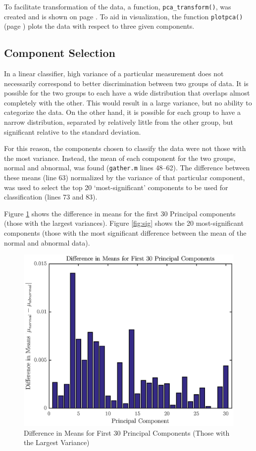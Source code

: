\documentclass[titlepage,12pt,letter]{article}
\begin{document}
To facilitate transformation of the data, a function, \verb`pca_transform()`,
was created and is shown on page \pageref{fun:pca}.  To aid in visualization,
the function \verb`plotpca()` (page \pageref{fun:plotpca}) plots the data with
respect to three given components.  

\newpage
\subsection{Component Selection}
In a linear classifier, high variance of a particular measurement does not
necessarily correspond to better discrimination between two groups of data.  It
is possible for the two groups to each have a wide distribution that overlaps
almost completely with the other.  This would result in a large variance, but no
ability to categorize the data.  On the other hand, it is possible for each
group to have a narrow distribution, separated by relatively little from the 
other group, but significant relative to the standard deviation.  

For this reason, the components chosen to classify the data were not those with
the most variance.  Instead, the mean of each component for the two groups,
normal and abnormal, was found (\verb`gather.m` lines 48--62).  The difference
between these means (line 63) normalized by the variance of that particular
component, was used to select the top 20 `most-significant' components to be
used for classification (lines 73 and 83).  

Figure \ref{fig:diff} shows the difference in means for the first 30
Principal components (those with the largest variances).  Figure \ref{fig:sig}
shows the 20 most-significant components (those with the most significant
difference between the mean of the normal and abnormal data).  

\begin{figure}[hptb]
    \centering
    \includegraphics[height=0.41\textheight]{../figures/train_03}
    \caption{Difference in Means for First 30 Principal Components (Those with
    the Largest Variance)}
    \label{fig:diff}
\end{figure}
\end{document}
